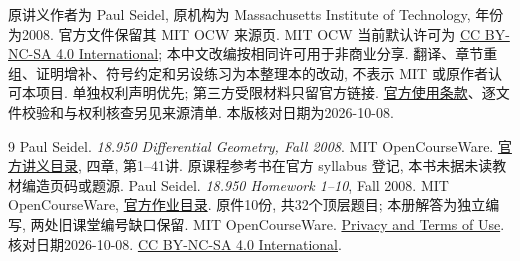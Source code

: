 原讲义作者为 Paul Seidel, 原机构为 Massachusetts Institute of Technology, 年份为2008. 官方文件保留其 MIT OCW 来源页. MIT OCW 当前默认许可为 \href{https://creativecommons.org/licenses/by-nc-sa/4.0/}{CC BY-NC-SA 4.0 International}; 本中文改编按相同许可用于非商业分享. 翻译、章节重组、证明增补、符号约定和另设练习为本整理本的改动, 不表示 MIT 或原作者认可本项目. 单独权利声明优先; 第三方受限材料只留官方链接. \href{https://ocw.mit.edu/pages/privacy-and-terms-of-use/}{官方使用条款}、逐文件校验和与权利核查另见来源清单. 本版核对日期为2026-10-08.
\clearpage
{}
\originalcontents
\clearpage
\mainmatter
























\begin{thebibliography}{9}
 Paul Seidel. \textit{18.950 Differential Geometry, Fall 2008}. MIT OpenCourseWare. \href{https://ocw.mit.edu/courses/18-950-differential-geometry-fall-2008/pages/lecture-notes/}{官方讲义目录}, 四章, 第1--41讲. 原课程参考书在官方 syllabus 登记, 本书未据未读教材编造页码或题源.
 Paul Seidel. \textit{18.950 Homework 1--10}, Fall 2008. MIT OpenCourseWare, \href{https://ocw.mit.edu/courses/18-950-differential-geometry-fall-2008/pages/assignments/}{官方作业目录}. 原件10份, 共32个顶层题目; 本册解答为独立编写, 两处旧课堂编号缺口保留.
 MIT OpenCourseWare. \href{https://ocw.mit.edu/pages/privacy-and-terms-of-use/}{Privacy and Terms of Use}. 核对日期2026-10-08. \href{https://creativecommons.org/licenses/by-nc-sa/4.0/}{CC BY-NC-SA 4.0 International}.
\end{thebibliography}

